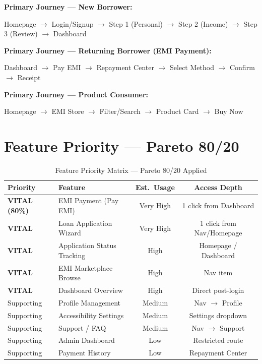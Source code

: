 \documentclass[11pt,a4paper]{article}
\begin{document}
\textbf{Primary Journey --- New Borrower:}
\begin{center}
Homepage $\rightarrow$ Login/Signup $\rightarrow$ Step 1 (Personal) $\rightarrow$ Step 2 (Income) $\rightarrow$ Step 3 (Review) $\rightarrow$ Dashboard
\end{center}

\textbf{Primary Journey --- Returning Borrower (EMI Payment):}
\begin{center}
Dashboard $\rightarrow$ Pay EMI $\rightarrow$ Repayment Center $\rightarrow$ Select Method $\rightarrow$ Confirm $\rightarrow$ Receipt
\end{center}

\textbf{Primary Journey --- Product Consumer:}
\begin{center}
Homepage $\rightarrow$ EMI Store $\rightarrow$ Filter/Search $\rightarrow$ Product Card $\rightarrow$ Buy Now
\end{center}

\section{Feature Priority — Pareto 80/20}

\begin{table}[H]
\caption{Feature Priority Matrix — Pareto 80/20 Applied}
\centering\small
\begin{tabularx}{\textwidth}{l X c c}
\toprule
\textbf{Priority} & \textbf{Feature} & \textbf{Est.\ Usage} & \textbf{Access Depth} \\
\midrule
\rowcolor{tagbg}\textbf{VITAL (80\%)} & EMI Payment (Pay EMI) & Very High & 1 click from Dashboard \\
\rowcolor{tagbg}\textbf{VITAL} & Loan Application Wizard & Very High & 1 click from Nav/Homepage \\
\rowcolor{tagbg}\textbf{VITAL} & Application Status Tracking & High & Homepage / Dashboard \\
\rowcolor{tagbg}\textbf{VITAL} & EMI Marketplace Browse & High & Nav item \\
\rowcolor{tagbg}\textbf{VITAL} & Dashboard Overview & High & Direct post-login \\
 Supporting & Profile Management & Medium & Nav $\rightarrow$ Profile \\
 Supporting & Accessibility Settings & Medium & Settings dropdown \\
 Supporting & Support / FAQ & Medium & Nav $\rightarrow$ Support \\
 Supporting & Admin Dashboard & Low & Restricted route \\
 Supporting & Payment History & Low & Repayment Center \\
\bottomrule
\end{tabularx}
\end{table}
\end{document}
